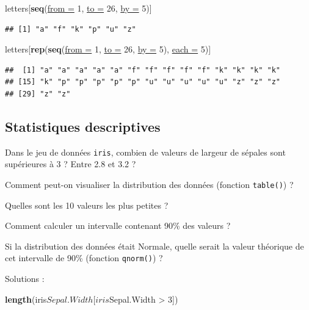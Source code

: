 \documentclass[twoside,symmetric]{book}
\newenvironment{Shaded}{}{}
\newcommand{\DataTypeTok}[1]{\underline{#1}}
\newcommand{\DecValTok}[1]{#1}
\newcommand{\KeywordTok}[1]{\textbf{#1}}
\newcommand{\NormalTok}[1]{#1}
\newcommand{\OperatorTok}[1]{#1}
\newcommand{\StringTok}[1]{#1}
\begin{document}
\begin{Shaded}
\begin{Highlighting}[]
\NormalTok{letters[}\KeywordTok{seq}\NormalTok{(}\DataTypeTok{from =} \DecValTok{1}\NormalTok{, }\DataTypeTok{to =} \DecValTok{26}\NormalTok{, }\DataTypeTok{by =} \DecValTok{5}\NormalTok{)]}
\end{Highlighting}
\end{Shaded}

\begin{verbatim}
## [1] "a" "f" "k" "p" "u" "z"
\end{verbatim}

\begin{Shaded}
\begin{Highlighting}[]
\NormalTok{letters[}\KeywordTok{rep}\NormalTok{(}\KeywordTok{seq}\NormalTok{(}\DataTypeTok{from =} \DecValTok{1}\NormalTok{, }\DataTypeTok{to =} \DecValTok{26}\NormalTok{, }\DataTypeTok{by =} \DecValTok{5}\NormalTok{), }\DataTypeTok{each =} \DecValTok{5}\NormalTok{)]}
\end{Highlighting}
\end{Shaded}

\begin{verbatim}
##  [1] "a" "a" "a" "a" "a" "f" "f" "f" "f" "f" "k" "k" "k" "k"
## [15] "k" "p" "p" "p" "p" "p" "u" "u" "u" "u" "u" "z" "z" "z"
## [29] "z" "z"
\end{verbatim}

\hypertarget{statistiques-descriptives-1}{%
\subsection{Statistiques descriptives}\label{statistiques-descriptives-1}}

Dans le jeu de données \texttt{iris}, combien de valeurs de largeur de sépales sont supérieures à 3 ? Entre 2.8 et 3.2 ?

Comment peut-on visualiser la distribution des données (fonction \texttt{table()}) ?

Quelles sont les 10 valeurs les plus petites ?

Comment calculer un intervalle contenant 90\% des valeurs ?

Si la distribution des données était Normale, quelle serait la valeur théorique de cet intervalle de 90\% (fonction \texttt{qnorm()}) ?

Solutions :

\begin{Shaded}
\begin{Highlighting}[]
\KeywordTok{length}\NormalTok{(iris}\OperatorTok{$}\NormalTok{Sepal.Width[iris}\OperatorTok{$}\NormalTok{Sepal.Width }\OperatorTok{>}\StringTok{ }\DecValTok{3}\NormalTok{])}
\end{Highlighting}
\end{Shaded}
\end{document}
